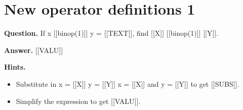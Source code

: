 \documentclass{article}
\begin{document}
\section*{New operator definitions 1}
\textbf{Question.} If x [[binop(1)]] y = [[TEXT]], find [[X]] [[binop(1)]] [[Y]].

\textbf{Answer.} [[VALU]]

\textbf{Hints.}
\begin{itemize}
  \item Substitute in
            x = [[X]]
            y = [[Y]]
            x = [[X]] and y = [[Y]]
        to get [[SUBS]].
  \item Simplify the expression to get [[VALU]].
\end{itemize}
\end{document}
